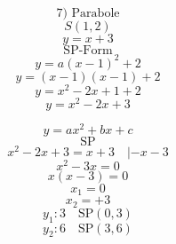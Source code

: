 \documentclass{article}
\begin{document}
\[ \text{7)  Parabole} \]
\[ S(1,2) \]
\[ y = x+3 \]
\[ \text{SP-Form} \]
\[ y = a(x-1)^2 + 2 \]
\[ y = (x-1)(x-1) + 2 \]
\[ y = x^2 - 2x + 1 + 2 \]
\[ y = x^2 - 2x + 3 \]

\[ y = ax^2 + bx + c \]
\[ \text{SP} \]
\[ x^2 - 2x + 3 = x + 3 \quad |-x-3 \]
\[ x^2 - 3x = 0 \]
\[ x(x-3) = 0 \]
\[ x_1 = 0 \]
\[ x_2 = +3 \]
\[ y_1: 3 \quad \text{SP}(0,3) \]
\[ y_2: 6 \quad \text{SP}(3,6) \]
\end{document}
